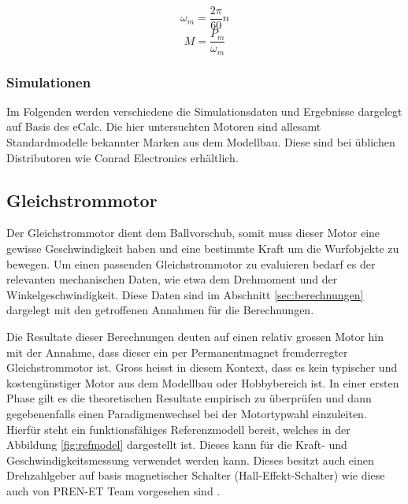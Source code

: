 \[ \omega_m = \frac{2\pi}{60} n \]
\[ M = \frac{P_m}{\omega_m} \]

\subsubsection{Simulationen}
Im Folgenden werden verschiedene die Simulationsdaten und Ergebnisse
dargelegt auf Basis des eCalc. Die hier untersuchten Motoren sind
allesamt Standardmodelle bekannter Marken aus dem Modellbau. Diese
sind bei üblichen Distributoren wie Conrad Electronics erhältlich.

\newpage


\newpage


\newpage


\newpage

\newpage

\subsection{Gleichstrommotor}
Der Gleichstrommotor dient dem Ballvorschub, somit muss dieser Motor
eine gewisse Geschwindigkeit haben und eine bestimmte Kraft um die
Wurfobjekte zu bewegen. Um einen passenden Gleichstrommotor zu evaluieren
bedarf es der relevanten mechanischen Daten, wie etwa dem Drehmoment und
der Winkelgeschwindigkeit. Diese Daten sind im Abschnitt
\ref{sec:berechnungen} dargelegt mit den getroffenen Annahmen für die
Berechnungen.

Die Resultate dieser Berechnungen deuten auf einen relativ grossen Motor
hin mit der Annahme, dass dieser ein per Permanentmagnet fremderregter
Gleichstrommotor ist. Gross heisst in diesem Kontext, dass es kein
typischer und kostengünstiger Motor aus dem Modellbau oder Hobbybereich
ist. In einer ersten Phase gilt es die theoretischen Resultate empirisch zu
überprüfen und dann gegebenenfalls einen Paradigmenwechsel bei der
Motortypwahl einzuleiten. Hierfür steht ein funktionsfähiges
Referenzmodell bereit, welches in der Abbildung \ref{fig:refmodel}
dargestellt ist. Dieses kann für die Kraft- und Geschwindigkeitsmessung
verwendet werden kann. Dieses besitzt auch einen Drehzahlgeber auf basis
magnetischer Schalter (Hall-Effekt-Schalter) wie diese auch von PREN-ET Team
vorgesehen sind \cite{pren-et-doc}.

